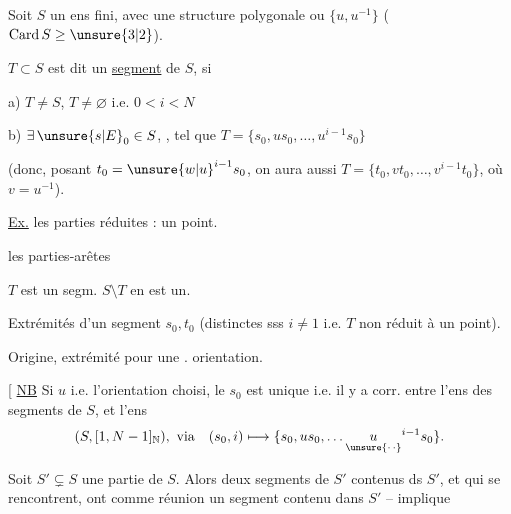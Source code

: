 Soit $S$ un ens fini, avec une structure polygonale ou  $\{u,u^{-1}\}$ ($\mathrm{Card}\,S\geq\unsure{3|2}$).

 $T\subset S$  est dit un  \uline{segment} de $S$, si

a)  $T\ne S$, $T\ne\varnothing$  i.e. $0<i<N$

b) $\exists\,\unsure{s|E}_0\in S$, , tel que $T=\{s_0,us_0,\ldots,u^{i-1}s_0\}$

(donc, posant $t_0=\unsure{w|u}^{i-1}s_0$, on aura aussi $T=\{t_0,vt_0,\ldots,v^{i-1}t_0\}$, où $v=u^{-1}$).

\uline{Ex.} les parties réduites : un point.

les parties-arêtes


$T$ est un segm.  $S\setminus T$ en est un.




Extrémités d'un segment $s_0,t_0$ (distinctes sss $i\ne1$ i.e. $T$ non réduit à un point).

Origine, extrémité pour une . orientation.

[ \uline{NB} Si $u$ i.e. l'orientation choisi, le $s_0$ est unique i.e. il y a corr.  entre l'ens des segments de $S$, et l'ens
\[
 (S,[1,N-1]_{\mathbb N}),\ \text{via}\quad (s_0,i)\longmapsto\{s_0,us_0,\ldots \underset{\unsure{\cdot\,\cdot}}{u}^{i-1}s_0\}.
\]

Soit $S'\subsetneq S$ une partie de $S$. Alors  deux segments de $S'$ contenus ds $S'$, et qui se rencontrent, ont comme réunion un segment  contenu dans $S'$ --  implique

